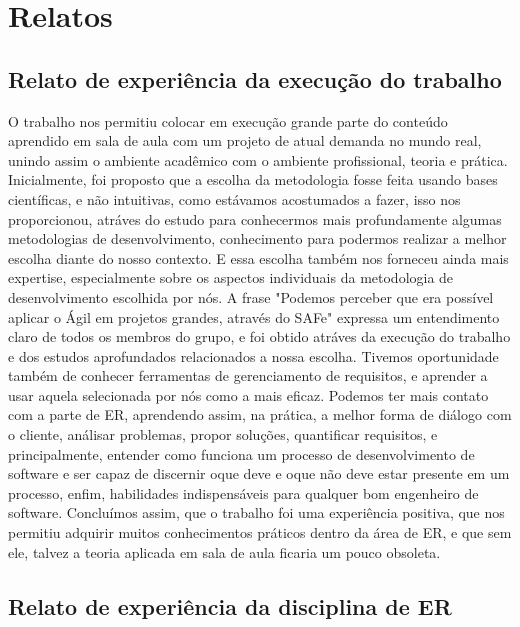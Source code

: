 \chapter{Relatos}

\section{Relato de experiência da execução do trabalho}

    O trabalho nos permitiu colocar em execução grande parte do conteúdo aprendido em sala de aula
com um projeto de atual demanda no mundo real, unindo assim o ambiente acadêmico com o ambiente profissional,
teoria e prática.
Inicialmente, foi proposto que a escolha da metodologia fosse feita usando bases científicas, e não
intuitivas, como estávamos acostumados a fazer, isso nos proporcionou, atráves do estudo para conhecermos
mais profundamente algumas metodologias de desenvolvimento, conhecimento para podermos realizar a melhor
escolha diante do nosso contexto. E essa escolha também nos forneceu ainda mais expertise,
especialmente sobre os aspectos individuais da metodologia de desenvolvimento escolhida por nós.
A frase "Podemos perceber que era possível aplicar o Ágil em projetos grandes, através do SAFe"
expressa um entendimento claro de todos os membros do grupo, e foi obtido atráves da execução do trabalho
e dos estudos aprofundados relacionados a nossa escolha.
    Tivemos oportunidade também de conhecer ferramentas de gerenciamento de requisitos, e aprender a usar
aquela selecionada por nós como a mais eficaz.
    Podemos ter mais contato com a parte de ER, aprendendo assim, na prática, a melhor forma de diálogo
com o cliente, análisar problemas, propor soluções, quantificar requisitos, e principalmente,
entender como funciona um processo de desenvolvimento de software e ser capaz de discernir oque deve
e oque não deve estar presente em um processo, enfim, habilidades indispensáveis
para qualquer bom engenheiro de software.
    Concluímos assim, que o trabalho foi uma experiência positiva, que nos permitiu adquirir muitos
conhecimentos práticos dentro da área de ER, e que sem ele, talvez a teoria aplicada em sala de aula
ficaria um pouco obsoleta.

\section{Relato de experiência da disciplina de ER}

